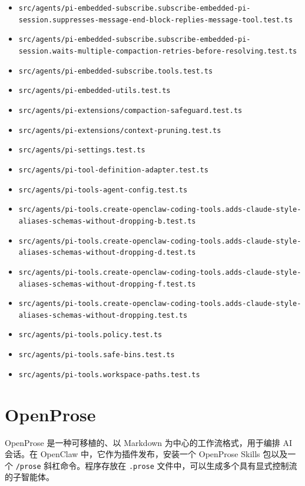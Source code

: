 \begin{itemize}
  \item \texttt{src/agents/pi-embedded-subscribe.subscribe-embedded-pi-session.suppresses-message-end-block-replies-message-tool.test.ts}
  \item \texttt{src/agents/pi-embedded-subscribe.subscribe-embedded-pi-session.waits-multiple-compaction-retries-before-resolving.test.ts}
  \item \texttt{src/agents/pi-embedded-subscribe.tools.test.ts}
  \item \texttt{src/agents/pi-embedded-utils.test.ts}
  \item \texttt{src/agents/pi-extensions/compaction-safeguard.test.ts}
  \item \texttt{src/agents/pi-extensions/context-pruning.test.ts}
  \item \texttt{src/agents/pi-settings.test.ts}
  \item \texttt{src/agents/pi-tool-definition-adapter.test.ts}
  \item \texttt{src/agents/pi-tools-agent-config.test.ts}
  \item \texttt{src/agents/pi-tools.create-openclaw-coding-tools.adds-claude-style-aliases-schemas-without-dropping-b.test.ts}
  \item \texttt{src/agents/pi-tools.create-openclaw-coding-tools.adds-claude-style-aliases-schemas-without-dropping-d.test.ts}
  \item \texttt{src/agents/pi-tools.create-openclaw-coding-tools.adds-claude-style-aliases-schemas-without-dropping-f.test.ts}
  \item \texttt{src/agents/pi-tools.create-openclaw-coding-tools.adds-claude-style-aliases-schemas-without-dropping.test.ts}
  \item \texttt{src/agents/pi-tools.policy.test.ts}
  \item \texttt{src/agents/pi-tools.safe-bins.test.ts}
  \item \texttt{src/agents/pi-tools.workspace-paths.test.ts}
\end{itemize}



\clearpage

\section{OpenProse}


OpenProse 是一种可移植的、以 Markdown 为中心的工作流格式，用于编排 AI 会话。在 OpenClaw 中，它作为插件发布，安装一个 OpenProse Skills 包以及一个 \texttt{/prose} 斜杠命令。程序存放在 \texttt{.prose} 文件中，可以生成多个具有显式控制流的子智能体。

